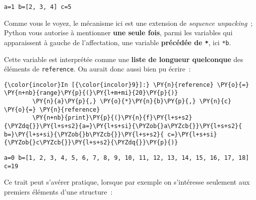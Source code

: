     \begin{Verbatim}[commandchars=\\\{\}]
a=1 b=[2, 3, 4] c=5

    \end{Verbatim}

    Comme vous le voyez, le mécanisme ici est une extension de
\emph{sequence unpacking}~; Python vous autorise à mentionner
\textbf{une seule fois}, parmi les variables qui apparaissent à gauche
de l'affectation, une variable \textbf{précédée de \texttt{*}}, ici
\texttt{*b}.

Cette variable est interprétée comme une \textbf{liste de longueur
quelconque} des éléments de \texttt{reference}. On aurait donc aussi
bien pu écrire~:

    \begin{Verbatim}[commandchars=\\\{\}]
{\color{incolor}In [{\color{incolor}9}]:} \PY{n}{reference} \PY{o}{=} \PY{n+nb}{range}\PY{p}{(}\PY{l+m+mi}{20}\PY{p}{)}
        \PY{n}{a}\PY{p}{,} \PY{o}{*}\PY{n}{b}\PY{p}{,} \PY{n}{c} \PY{o}{=} \PY{n}{reference}
        \PY{n+nb}{print}\PY{p}{(}\PY{n}{f}\PY{l+s+s2}{\PYZdq{}}\PY{l+s+s2}{a=}\PY{l+s+si}{\PYZob{}a\PYZcb{}}\PY{l+s+s2}{ b=}\PY{l+s+si}{\PYZob{}b\PYZcb{}}\PY{l+s+s2}{ c=}\PY{l+s+si}{\PYZob{}c\PYZcb{}}\PY{l+s+s2}{\PYZdq{}}\PY{p}{)}
\end{Verbatim}


    \begin{Verbatim}[commandchars=\\\{\}]
a=0 b=[1, 2, 3, 4, 5, 6, 7, 8, 9, 10, 11, 12, 13, 14, 15, 16, 17, 18] c=19

    \end{Verbatim}

    Ce trait peut s'avérer pratique, lorsque par exemple on s'intéresse
seulement aux premiers éléments d'une structure~:

